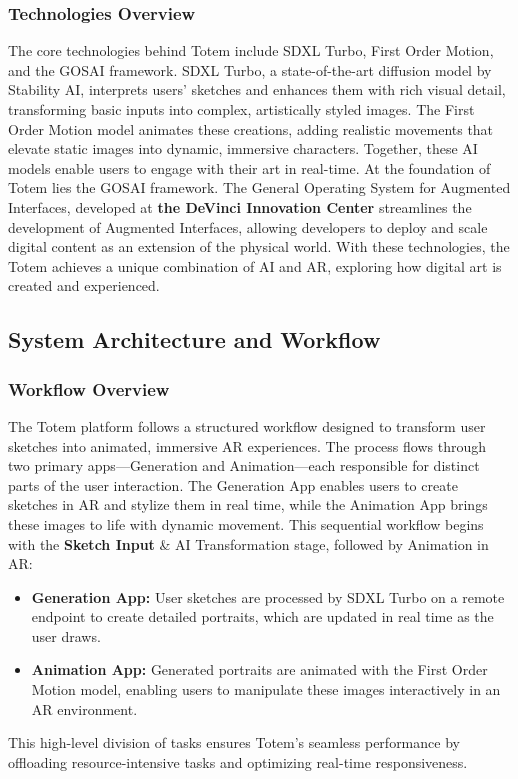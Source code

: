 \subsubsection{Technologies Overview}
The core technologies behind Totem include SDXL Turbo\cite{sauer2023adversarial}, First Order Motion\cite{Siarohin_2019_NeurIPS}, and the GOSAI framework\cite{gosai2022}.
SDXL Turbo, a state-of-the-art diffusion model by Stability AI, interprets users' sketches and enhances them with rich visual detail, transforming basic inputs into complex, artistically styled images.
The First Order Motion model animates these creations, adding realistic movements that elevate static images into dynamic, immersive characters.
Together, these AI models enable users to engage with their art in real-time.
At the foundation of Totem lies the GOSAI framework. The General Operating System for Augmented Interfaces, developed at \textbf{the DeVinci Innovation Center} streamlines the development of Augmented Interfaces, allowing developers to deploy and scale digital content as an extension of the physical world.
With these technologies, the Totem achieves a unique combination of AI and AR, exploring how digital art is created and experienced.

\subsection{ System Architecture and Workflow }

\subsubsection{Workflow Overview}
The Totem platform follows a structured workflow designed to transform user sketches into animated, immersive AR experiences.
The process flows through two primary apps—Generation and Animation—each responsible for distinct parts of the user interaction.
The Generation App enables users to create sketches in AR and stylize them in real time, while the Animation App brings these images to life with dynamic movement.
This sequential workflow begins with the \textbf{Sketch Input} \& AI Transformation stage, followed by Animation in AR:

\begin{itemize}
    \item \textbf{Generation App:} User sketches are processed by SDXL Turbo on a remote endpoint to create detailed portraits, which are updated in real time as the user draws.
    \item  \textbf{Animation App:} Generated portraits are animated with the First Order Motion model, enabling users to manipulate these images interactively in an AR environment.
\end{itemize}
This high-level division of tasks ensures Totem’s seamless performance by offloading resource-intensive tasks and optimizing real-time responsiveness.

